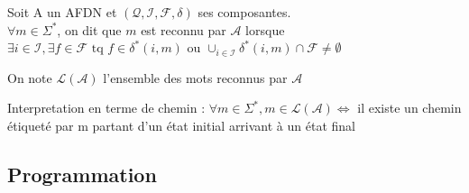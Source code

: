 \begin{definition}
    Soit A un AFDN et $(\mathcal{Q},\mathcal{I},\mathcal{F},\delta)$ ses composantes.\\
    $\forall m \in \Sigma^*$, on dit que $m$ est reconnu par $\mathcal{A}$ lorsque
    $\exists i \in \mathcal{I},\exists f \in \mathcal{F} \text{ tq } f\in \delta^*(i,m)$ ou
    $\cup_{i\in \mathcal{I}} \delta^*(i,m)\cap \mathcal{F} \not= \emptyset$

    On note $\mathcal{L}(\mathcal{A})$ l'ensemble des mots reconnus par $\mathcal{A}$
\end{definition}

Interpretation en terme de chemin : $\forall m \in \Sigma^*, m\in \mathcal{L}(\mathcal{A}) \Leftrightarrow$ il existe un chemin
étiqueté par m partant d'un état initial arrivant à un état final

\subsection{Programmation}











